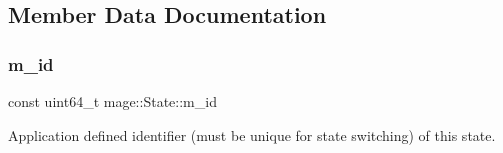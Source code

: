 \subsection{Member Data Documentation}
\hypertarget{classmage_1_1_state_ab135514ec2250e9680b35cfab4e91cab}{}\label{classmage_1_1_state_ab135514ec2250e9680b35cfab4e91cab} 
\subsubsection{\texorpdfstring{m\+\_\+id}{m\_id}}
{\footnotesize\ttfamily const uint64\+\_\+t mage\+::\+State\+::m\+\_\+id\hspace{0.3cm}{\ttfamily [private]}}

Application defined identifier (must be unique for state switching) of this state. 